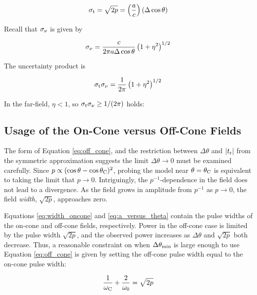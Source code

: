 \documentclass[amsmath,amssymb,aps,prd,10pt,twocolumn]{revtex4}
\begin{document}
\begin{equation}
\sigma_{\rm t} = \sqrt{2p} = \left(\frac{a}{c}\right)(\Delta \cos\theta) \label{eq:a_versus_theta}
\end{equation}

Recall that $\sigma_{\rm \nu}$ is given by

\begin{equation}
\sigma_{\rm \nu} = \frac{c}{2\pi a \Delta\cos\theta}\left(1+\eta^2\right)^{1/2} \label{eq:sigmanu3}
\end{equation}

The uncertainty product is

\begin{equation}
\sigma_{\rm t} \sigma_{\rm \nu} = \frac{1}{2 \pi} \left(1+\eta^2\right)^{1/2} \label{eq:sigma_result}
\end{equation}

In the far-field, $\eta < 1$, so $\sigma_{\rm t} \sigma_{\rm \nu} \geq 1/(2\pi)$ holds: 

\subsection{Usage of the On-Cone versus Off-Cone Fields}
\label{sec:usage}

The form of Equation \ref{eq:off_cone}, and the restriction between $\Delta\theta$ and $|t_{\rm r}|$ from the symmetric approximation suggests the limit $\Delta\theta \to 0$ must be examined carefully.  Since $p \propto (\cos\theta - \cos\theta_{\rm C})^2$, probing the model near $\theta = \theta_{\rm C}$ is equivalent to taking the limit that $p \to 0$.  Intriguingly, the $p^{-1}$-dependence in the field does not lead to a divergence.  As the field grows in amplitude from $p^{-1}$ as $p \to 0$, the field \textit{width}, $\sqrt{2p}$, approaches zero.

Equations \ref{eq:width_oncone} and \ref{eq:a_versus_theta} contain the pulse widths of the on-cone and off-cone fields, respectively.  Power in the off-cone case is limited by the pulse width $\sqrt{2p}$, and the observed power increases as $\Delta\theta$ and $\sqrt{2p}$ both decrease.  Thus, a reasonable constraint on when $\Delta\theta_{\rm min}$ is large enough to use Equation \ref{eq:off_cone} is given by setting the off-cone pulse width equal to the on-cone pulse width:

\begin{equation}
\frac{1}{\omega_{\rm C}} + \frac{2}{\omega_{\rm 0}} = \sqrt{2p}
\end{equation}
\end{document}
